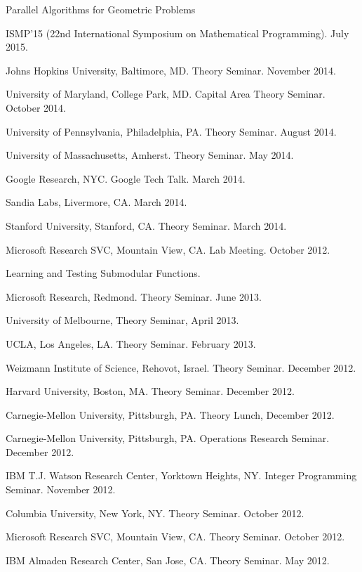 \documentclass[11pt]{article}
\newenvironment{innerlist}[1][\enskip\textbullet]%
        {\begin{compactitem}[#1]}{\end{compactitem}}
\begin{document}
\begin{innerlist}
\item Parallel Algorithms for Geometric Problems
\begin{innerlist}
\item ISMP'15 (22nd International Symposium on Mathematical Programming). July 2015.
\item Johns Hopkins University, Baltimore, MD. Theory Seminar. November 2014.
\item University of Maryland, College Park, MD. Capital Area Theory Seminar. October 2014.
\item University of Pennsylvania, Philadelphia, PA. Theory Seminar. August 2014.
\item University of Massachusetts, Amherst. Theory Seminar. May 2014.
\item Google Research, NYC. Google Tech Talk. March 2014.
\item Sandia Labs, Livermore, CA. March 2014.
\item Stanford University, Stanford, CA. Theory Seminar. March 2014.
\item Microsoft Research SVC, Mountain View, CA. Lab Meeting. October 2012.
\end{innerlist}

\item Learning and Testing Submodular Functions.
\begin{innerlist}
  \item Microsoft Research, Redmond. Theory Seminar. June 2013.
  \item University of Melbourne, Theory Seminar, April 2013.
  \item UCLA, Los Angeles, LA. Theory Seminar. February 2013.
  \item Weizmann Institute of Science, Rehovot, Israel. Theory Seminar. December 2012.  
  \item Harvard University, Boston, MA. Theory Seminar. December 2012.
  \item Carnegie-Mellon University, Pittsburgh, PA. Theory Lunch, December 2012.
  \item Carnegie-Mellon University, Pittsburgh, PA. Operations Research Seminar. December 2012.
  \item IBM T.J. Watson Research Center, Yorktown Heights, NY. Integer Programming Seminar. November 2012.
  \item Columbia University, New York, NY. Theory Seminar. October 2012.
  \item Microsoft Research SVC, Mountain View, CA. Theory Seminar. October 2012.
  \item IBM Almaden Research Center, San Jose, CA. Theory Seminar. May 2012.
\end{innerlist}


\end{innerlist}
\end{document}

